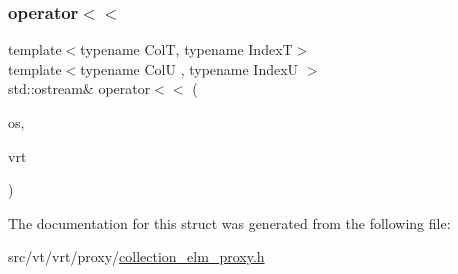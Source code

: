 \subsubsection{\texorpdfstring{operator$<$$<$}{operator<<}}
{\footnotesize\ttfamily template$<$typename ColT, typename IndexT$>$ \\
template$<$typename ColU , typename IndexU $>$ \\
std\+::ostream\& operator$<$$<$ (\begin{DoxyParamCaption}\item[{std\+::ostream \&}]{os,  }\item[{\hyperlink{structvt_1_1vrt_1_1collection_1_1_vrt_elm_proxy}{Vrt\+Elm\+Proxy}$<$ ColU, IndexU $>$ const \&}]{vrt }\end{DoxyParamCaption})\hspace{0.3cm}{\ttfamily [friend]}}



The documentation for this struct was generated from the following file\+:\begin{DoxyCompactItemize}
\item 
src/vt/vrt/proxy/\hyperlink{collection__elm__proxy_8h}{collection\+\_\+elm\+\_\+proxy.\+h}\end{DoxyCompactItemize}
